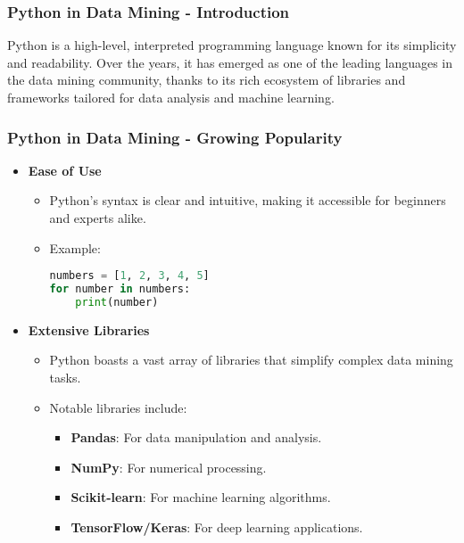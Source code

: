 \documentclass[aspectratio=169]{beamer}
\begin{document}
\begin{frame}[fragile]
    \frametitle{Python in Data Mining - Introduction}
    Python is a high-level, interpreted programming language known for its simplicity and readability. 
    Over the years, it has emerged as one of the leading languages in the data mining community, thanks to its rich ecosystem of libraries and frameworks tailored for data analysis and machine learning.
\end{frame}

\begin{frame}[fragile]
    \frametitle{Python in Data Mining - Growing Popularity}
    \begin{itemize}
        \item \textbf{Ease of Use}
        \begin{itemize}
            \item Python's syntax is clear and intuitive, making it accessible for beginners and experts alike.
            \item Example:
            \begin{lstlisting}[language=Python]
numbers = [1, 2, 3, 4, 5]
for number in numbers:
    print(number)
            \end{lstlisting}
        \end{itemize}
        
        \item \textbf{Extensive Libraries}
        \begin{itemize}
            \item Python boasts a vast array of libraries that simplify complex data mining tasks.
            \item Notable libraries include:
            \begin{itemize}
                \item \textbf{Pandas}: For data manipulation and analysis.
                \item \textbf{NumPy}: For numerical processing.
                \item \textbf{Scikit-learn}: For machine learning algorithms.
                \item \textbf{TensorFlow/Keras}: For deep learning applications.
            \end{itemize}
        \end{itemize}
    \end{itemize}
\end{frame}
\end{document}
